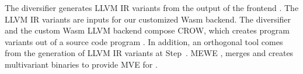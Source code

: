 The diversifier generates LLVM IR variants from the output of the frontend . 
The LLVM IR variants are inputs for our customized Wasm backend. 
The diversifier and the custom Wasm LLVM backend compose CROW, which creates \wasm program variants out of a source code program . 
In addition, an orthogonal tool comes from the generation of LLVM IR variants at Step~. MEWE  \cite{MEWE}, merges and creates multivariant binaries to provide MVE for \wasm {}.  



